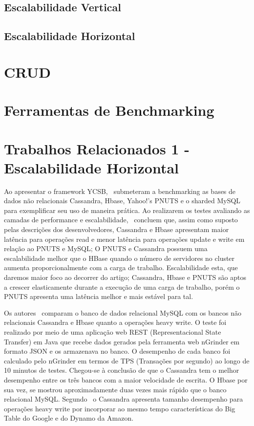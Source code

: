 \documentclass[a4paper,12pt,onecolumn,titlepage]{article}
\begin{document}
\subsection{Escalabilidade Vertical}
\label{subsec:vertical}

\subsection{Escalabilidade Horizontal}
\label{subsec:horizontal}

\section{CRUD}
\label{sec:crud}

\section{Ferramentas de Benchmarking}
\label{sec:ferramentas}

\section{Trabalhos Relacionados 1 - Escalabilidade Horizontal}
\label{sec:relacionados1}

Ao apresentar o framework YCSB,~\cite{cooper:2010} submeteram a benchmarking as bases de dados não relacionais Cassandra, Hbase, Yahoo!'s PNUTS e o sharded MySQL para exemplificar seu uso de maneira prática. Ao realizarem os testes avaliando as camadas de performance e escalabilidade,~\cite{cooper:2010} concluem que, assim como suposto pelas descrições dos desenvolvedores, Cassandra e Hbase apresentam maior latência para operações read e menor latência para operações update e write em relação ao PNUTS e MySQL; O PNUTS e Cassandra possuem uma escalabilidade melhor que o HBase quando o número de servidores no cluster aumenta proporcionalmente com a carga de trabalho. Escalabilidade esta, que daremos maior foco ao decorrer do artigo; Cassandra, Hbase e PNUTS são aptos a crescer elasticamente durante a execução de uma carga de trabalho, porém o PNUTS apresenta uma latência melhor e mais estável para tal.

Os autores~\cite{jogi:2016} comparam o banco de dados relacional MySQL com os bancos não relacionais Cassandra e Hbase quanto a operações heavy write. O teste foi realizado por meio de uma aplicação web REST (Representacional State Transfer) em Java que recebe dados gerados pela ferramenta web nGrinder em formato JSON e os armazenava no banco. O desempenho de cada banco foi calculado pelo nGrinder em termos  de TPS (Transações por segundo) ao longo de 10 minutos de testes. Chegou-se à conclusão de que o Cassandra tem o melhor desempenho entre os três bancos com a maior velocidade de escrita. O Hbase por sua vez, se mostrou aproximadamente duas vezes mais rápido que o banco relacional MySQL. Segundo~\cite{jogi:2016} o Cassandra apresenta tamanho desempenho para operações heavy write por incorporar ao mesmo tempo características do Big Table do Google e do Dynamo da Amazon.
\end{document}
